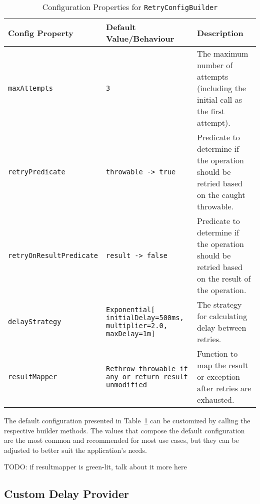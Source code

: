 \begin{table}[!htb]
    \centering
    \begin{tabular}{|l|p{5cm}|p{6cm}|}
        \hline
        \textbf{Config Property}        & \textbf{Default Value/Behaviour}                                       & \textbf{Description}                                                                            \\ \hline
        \texttt{maxAttempts}            & \texttt{3}                                                             & The maximum number of attempts (including the initial call as the first attempt).               \\ \hline
        \texttt{retryPredicate}         & \texttt{throwable -> true}                                             & Predicate to determine if the operation should be retried based on the caught throwable.        \\ \hline
        \texttt{retryOnResultPredicate} & \texttt{result -> false}                                               & Predicate to determine if the operation should be retried based on the result of the operation. \\ \hline
        \texttt{delayStrategy}          & \texttt{Exponential[ initialDelay=500ms, multiplier=2.0, maxDelay=1m]}          & The strategy for calculating delay between retries.                                             \\ \hline
        \texttt{resultMapper}           & \texttt{Rethrow throwable if any or return result unmodified}          & Function to map the result or exception after retries are exhausted.                            \\ \hline
    \end{tabular}
    \caption{Configuration Properties for \texttt{RetryConfigBuilder}}
    \label{tab:retry-config-builder}
\end{table}

The default configuration presented in Table~\ref{tab:retry-config-builder} can be customized
by calling the respective builder methods.
The values that compose the default configuration are the most common and recommended for most use cases, but they can be adjusted to better suit the application's needs.

TODO: if resultmapper is green-lit, talk about it more here

\subsection{Custom Delay Provider}\label{subsec:retry-custom-delay-provider}


